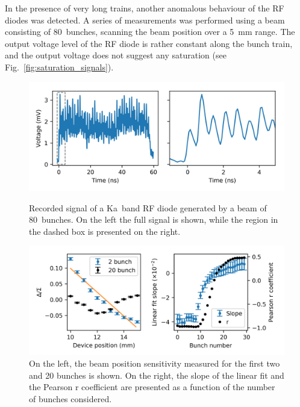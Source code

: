 In the presence of very long trains, another anomalous behaviour of the RF diodes was detected. A series of measurements was performed using a beam consisting of 80~bunches, scanning the beam position over a 5~mm range. The output voltage level of the RF diode is rather constant along the bunch train, and the output voltage does not suggest any saturation (see Fig.~\ref{fig:saturation_signals}). 

\begin{figure}[!t]
\centering
\includegraphics[scale=1, keepaspectratio]{pictures/long_train_signal}
\caption{Recorded signal of a Ka~band RF diode generated by a beam of 80~bunches. On the left the full signal is shown, while the region in the dashed box is presented on the right. }\label{fig:saturation_signals}

\vspace{3mm}
\includegraphics[scale=1, keepaspectratio]{pictures/long_train_response}
\caption{On the left, the beam position sensitivity measured for the first two and 20 bunches is shown. On the right, the slope of the linear fit and the Pearson r coefficient are presented as a function of the number of bunches considered.}
\label{fig:saturation_along_bunch}

\end{figure}

